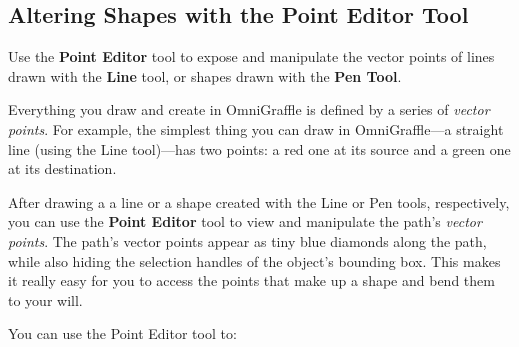 \documentclass[../main.tex]{subfiles}
\begin{document}
\subsection{ Altering Shapes with the Point Editor
Tool}

Use the \textbf{Point Editor} tool to expose and manipulate the vector points of lines drawn
with the \textbf{Line} tool, or shapes drawn with the \textbf{Pen Tool}.

Everything you draw and create in OmniGraffle is defined by a series of \textit{vector points}.
For example, the simplest thing you can draw in OmniGraffle---a straight line (using the Line
tool)---has two points: a red one at its source and a green one at its destination.


After drawing a a line or a shape created with the Line or Pen tools, respectively, you can use
the \textbf{Point Editor} tool to view and manipulate the path's \textit{vector points}. The
path's vector points appear as tiny blue diamonds along the path, while also hiding the
selection handles of the object's bounding box. This makes it really easy for you to access
the points that make up a shape and bend them to your will.


You can use the Point Editor tool to:
\end{document}
